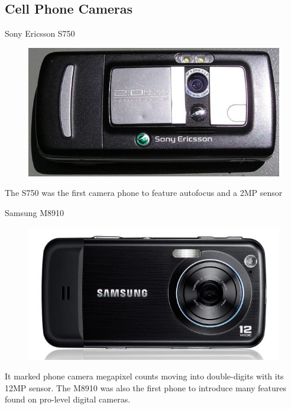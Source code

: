 \documentclass{beamer}
\begin{document}
	\subsection{Cell Phone Cameras}
	\begin{frame}{Sony Ericsson S750}
		\begin{figure}
			\centering
			\includegraphics[scale=0.4]{137.jpg}
		\end{figure}
		The S750 was the first camera phone to feature autofocus and a 2MP sensor
	\end{frame}
	\begin{frame}{Samsung M8910}
		\begin{figure}
			\centering
			\includegraphics[scale=0.4]{138.jpg}
		\end{figure}
		It marked phone camera megapixel counts moving into double-digits with its 12MP sensor. The M8910 was also the first phone to introduce many features found on pro-level digital cameras.
	\end{frame}
\end{document}

